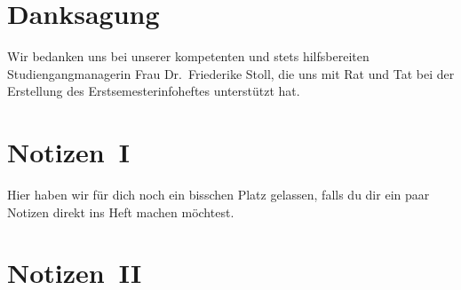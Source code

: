 \newpage
\section*{Danksagung}

Wir bedanken uns bei unserer kompetenten
und stets hilfsbereiten Studiengangmanagerin Frau Dr.~Friederike Stoll,
die uns mit Rat und Tat bei der Erstellung
des Erstsemesterinfoheftes unterstützt hat.

\section*{Notizen~I}

Hier haben wir für dich noch ein bisschen Platz gelassen,
falls du dir ein paar Notizen direkt ins Heft machen möchtest.

\newpage
\section*{Notizen~II}

